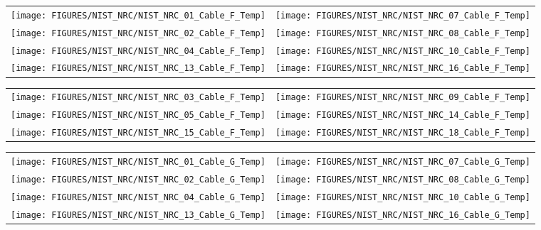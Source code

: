 \begin{figure}[p]
\begin{tabular*}{\textwidth}{l@{\extracolsep{\fill}}r}
\texttt{[image: FIGURES/NIST\_NRC/NIST\_NRC\_01\_Cable\_F\_Temp]} &
\texttt{[image: FIGURES/NIST\_NRC/NIST\_NRC\_07\_Cable\_F\_Temp]} \\
\texttt{[image: FIGURES/NIST\_NRC/NIST\_NRC\_02\_Cable\_F\_Temp]} &
\texttt{[image: FIGURES/NIST\_NRC/NIST\_NRC\_08\_Cable\_F\_Temp]} \\
\texttt{[image: FIGURES/NIST\_NRC/NIST\_NRC\_04\_Cable\_F\_Temp]} &
\texttt{[image: FIGURES/NIST\_NRC/NIST\_NRC\_10\_Cable\_F\_Temp]} \\
\texttt{[image: FIGURES/NIST\_NRC/NIST\_NRC\_13\_Cable\_F\_Temp]} &
\texttt{[image: FIGURES/NIST\_NRC/NIST\_NRC\_16\_Cable\_F\_Temp]}
\end{tabular*}
\label{NIST_NRC_Cable_F_Closed}
\end{figure}

\begin{figure}[p]
\begin{tabular*}{\textwidth}{l@{\extracolsep{\fill}}r}
\texttt{[image: FIGURES/NIST\_NRC/NIST\_NRC\_03\_Cable\_F\_Temp]} &
\texttt{[image: FIGURES/NIST\_NRC/NIST\_NRC\_09\_Cable\_F\_Temp]} \\
\texttt{[image: FIGURES/NIST\_NRC/NIST\_NRC\_05\_Cable\_F\_Temp]} &
\texttt{[image: FIGURES/NIST\_NRC/NIST\_NRC\_14\_Cable\_F\_Temp]} \\
\texttt{[image: FIGURES/NIST\_NRC/NIST\_NRC\_15\_Cable\_F\_Temp]} &
\texttt{[image: FIGURES/NIST\_NRC/NIST\_NRC\_18\_Cable\_F\_Temp]}
\end{tabular*}
\label{NIST_NRC_Cable_F_Open}
\end{figure}

\begin{figure}[p]
\begin{tabular*}{\textwidth}{l@{\extracolsep{\fill}}r}
\texttt{[image: FIGURES/NIST\_NRC/NIST\_NRC\_01\_Cable\_G\_Temp]} &
\texttt{[image: FIGURES/NIST\_NRC/NIST\_NRC\_07\_Cable\_G\_Temp]} \\
\texttt{[image: FIGURES/NIST\_NRC/NIST\_NRC\_02\_Cable\_G\_Temp]} &
\texttt{[image: FIGURES/NIST\_NRC/NIST\_NRC\_08\_Cable\_G\_Temp]} \\
\texttt{[image: FIGURES/NIST\_NRC/NIST\_NRC\_04\_Cable\_G\_Temp]} &
\texttt{[image: FIGURES/NIST\_NRC/NIST\_NRC\_10\_Cable\_G\_Temp]} \\
\texttt{[image: FIGURES/NIST\_NRC/NIST\_NRC\_13\_Cable\_G\_Temp]} &
\texttt{[image: FIGURES/NIST\_NRC/NIST\_NRC\_16\_Cable\_G\_Temp]}
\end{tabular*}
\label{NIST_NRC_Cable_G_Closed}
\end{figure}

